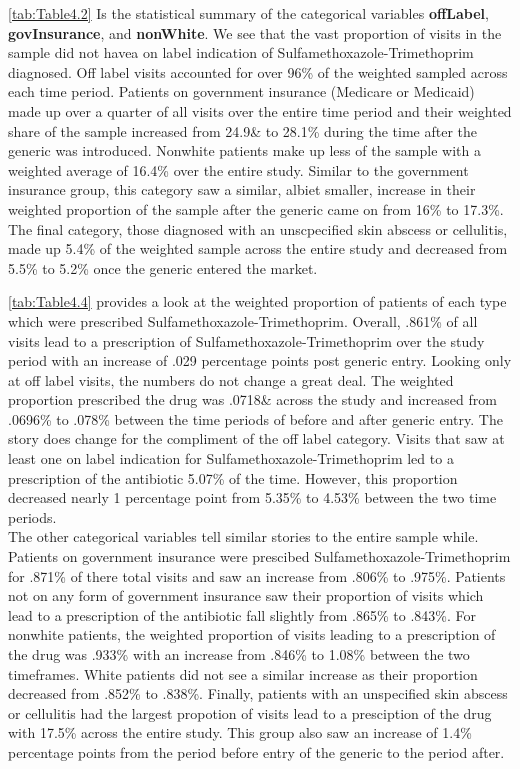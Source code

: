 \indent \autoref{tab:Table4.2} Is the statistical summary of the categorical variables \textbf{offLabel}, \textbf{govInsurance}, and \textbf{nonWhite}. We see that the vast proportion of visits in the sample did not havea on label indication of Sulfamethoxazole-Trimethoprim diagnosed. Off label visits accounted for over 96\% of the weighted sampled across each time period. Patients on government insurance (Medicare or Medicaid) made up over a quarter of all visits over the entire time period and their weighted share of the sample increased from 24.9\& to 28.1\% during the time after the generic was introduced. Nonwhite patients make up less of the sample with a weighted average of 16.4\% over the entire study. Similar to the government insurance group, this category saw a similar, albiet smaller, increase in their weighted proportion of the sample after the generic came on from 16\% to 17.3\%. The final category, those diagnosed with an unscpecified skin abscess or cellulitis, made up 5.4\% of the weighted sample across the entire study and decreased from 5.5\% to 5.2\% once the generic entered the market.
\begin{landscape}

\end{landscape} 
\begin{landscape}

\end{landscape}
\autoref{tab:Table4.4} provides a look at the weighted proportion of patients of each type which were prescribed Sulfamethoxazole-Trimethoprim. Overall, .861\% of all visits lead to a prescription of Sulfamethoxazole-Trimethoprim over the study period with an increase of .029 percentage points post generic entry. Looking only at off label visits, the numbers do not change a great deal. The weighted proportion prescribed the drug was .0718\& across the study and increased from .0696\% to .078\% between the time periods of before and after generic entry. The story does change for the compliment of the off label category. Visits that saw at least one on label indication for Sulfamethoxazole-Trimethoprim led to a prescription of the antibiotic 5.07\% of the time. However, this proportion decreased nearly 1 percentage point from 5.35\% to 4.53\% between the two time periods.\\
\indent The other categorical variables tell similar stories to the entire sample while. Patients on government insurance were prescibed Sulfamethoxazole-Trimethoprim for .871\% of there total visits and saw an increase from .806\% to .975\%. Patients not on any form of government insurance saw their proportion of visits which lead to a prescription of the antibiotic fall slightly from .865\% to .843\%. For nonwhite patients, the weighted proportion of visits leading to a prescription of the drug was .933\% with an increase from .846\% to 1.08\% between the two timeframes. White patients did not see a similar increase as their proportion decreased from .852\% to .838\%. Finally, patients with an unspecified skin abscess or cellulitis had the largest propotion of visits lead to a presciption of the drug with 17.5\% across the entire study. This group also saw an increase of 1.4\% percentage points from the period before entry of the generic to the period after. 
\begin{landscape}

\end{landscape}